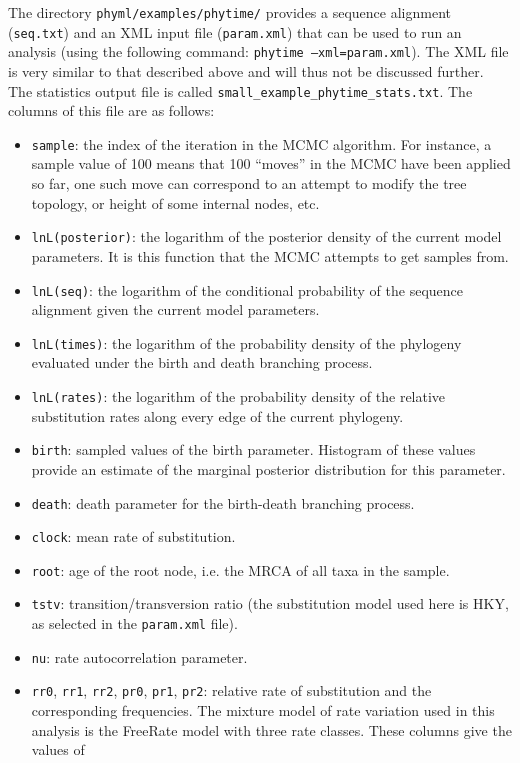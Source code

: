 \documentclass[a4paper,12pt]{article}
\newcommand{\x}[1]{\texttt{#1}}
\begin{document}
The directory \x{phyml/examples/phytime/} provides a sequence alignment (\x{seq.txt}) and an XML
input file (\x{param.xml}) that can be used to run an analysis (using the following command:
\x{phytime --xml=param.xml}). The XML file is very similar to that described above and will thus not
be discussed further. The statistics output file is called \x{small\_example\_phytime\_stats.txt}. The
columns of this file are as follows:
\begin{itemize}
\item \x{sample}: the index of the iteration in the MCMC algorithm. For instance, a sample value of
  100 means that 100 ``moves'' in the MCMC have been applied so far, one such move can correspond to
  an attempt to modify the tree topology, or  height of some internal nodes, etc.
\item \x{lnL(posterior)}: the logarithm of the posterior density of the current model parameters. It is this function
  that the MCMC attempts to get samples from.
\item \x{lnL(seq)}: the logarithm of the conditional probability of the sequence alignment given the current model
  parameters.
\item \x{lnL(times)}: the logarithm of the probability density of the phylogeny evaluated under the
  birth and death branching process.
\item \x{lnL(rates)}: the logarithm of the probability density of the relative substitution rates
  along every edge of the current phylogeny.
\item \x{birth}: sampled values of the birth parameter. Histogram of these values provide an
  estimate of the marginal posterior distribution for this parameter.
\item \x{death}: death parameter for the birth-death branching process.
\item \x{clock}: mean rate of substitution.
\item \x{root}: age of the root node, i.e. the MRCA of all taxa in the sample.
\item \x{tstv}: transition/transversion ratio (the substitution model used
  here is HKY, as selected in the \x{param.xml} file).
\item \x{nu}: rate autocorrelation parameter.
\item \x{rr0}, \x{rr1}, \x{rr2}, \x{pr0}, \x{pr1}, \x{pr2}: relative rate of substitution and the
  corresponding frequencies. The mixture model of rate variation used in this analysis is the
  FreeRate model \cite{soubrier12} with three rate classes. These  columns give the values of

\end{itemize}
\end{document}
